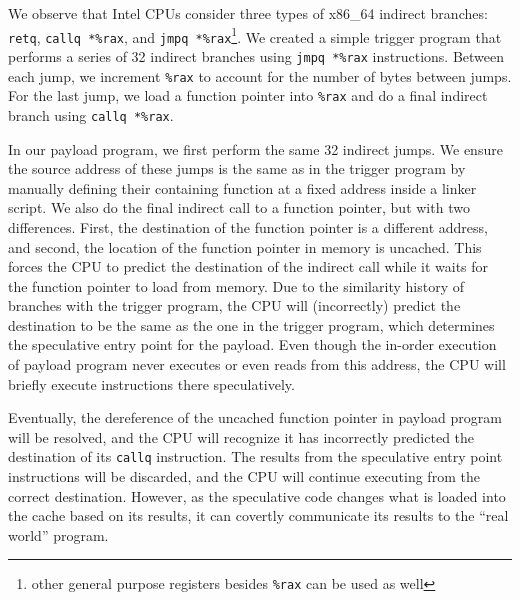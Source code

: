 We observe that Intel CPUs consider three types of x86\_64 indirect branches:
\texttt{retq}, \texttt{callq *\%rax}, and \texttt{jmpq *\%rax}\footnote{other
general purpose registers besides \texttt{\%rax} can be used as well}.
We created a simple trigger program that performs a series of 32 indirect
branches
using \texttt{jmpq *\%rax} instructions. Between each jump, we increment
\texttt{\%rax} to account for the number of bytes between jumps. For the last
jump, we load a function pointer into \texttt{\%rax} and do a final indirect
branch using \texttt{callq *\%rax}.

In our payload program, we first perform the same 32 indirect jumps. We ensure
the source address of these jumps is the same as in the trigger program by
manually defining their containing function at a fixed address inside a linker
script. We also do the final indirect call to a function pointer, but with two
differences. First, the destination of the function pointer is a different
address, and second, the location of the function pointer in memory is uncached.
This forces the CPU to predict the destination of the indirect call while it
waits for the function pointer to load from memory. Due to the similarity
history of branches with the trigger program,
the CPU will (incorrectly) predict the destination to be the same as the one in
the trigger program, which determines the speculative entry point for the
payload. Even though the in-order execution of
payload program never executes or even reads from this address, the CPU will
briefly execute instructions there speculatively.

Eventually, the dereference of the uncached function pointer in payload program
will be resolved, and the CPU will recognize it has incorrectly predicted the
destination of its \texttt{callq} instruction. The results from the speculative
entry point instructions will be discarded, and the CPU will continue executing
from the correct destination. However, as the speculative code changes what is
loaded into the cache based on its results, it can covertly communicate its
results to the ``real world'' program.


